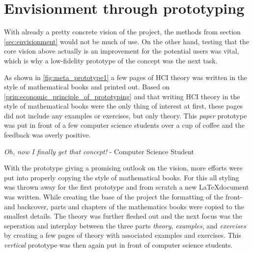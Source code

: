 \section*{Envisionment through prototyping}
With already a pretty concrete vision of the project, the methods from section \ref{sec:envisionment} would not be much of use. On the other hand, testing that the core vision above actually is an improvement for the potential users was vital, which is why a low-fidelity prototype of the concept was the next task.



As shown in \ref{fig:meta_prototype1} a few pages of HCI theory was written in the style of mathematical books and printed out. Based on \ref{prin:economic_principle_of_prototyping} and that writing HCI theory in the style of mathematical books were the only thing of interest at first, these pages did not include any examples or exercises, but only theory. This \emph{paper} prototype was put in front of a few computer science students over a cup of coffee and the feedback was overly positive.

\begin{displayquote}
  \emph{Oh, now I finally get that concept!} - Computer Science Student
\end{displayquote}

With the prototype giving a promising outlook on the vision, more efforts were put into properly copying the style of mathematical books. For this all styling was thrown away for the first prototype and from scratch a new \LaTeX document was written. While creating the base of the project the formatting of the front- and backcover, parts and chapters of the mathematics books were copied to the smallest details. The theory was further fleshed out and the next focus was the seperation and interplay between the three parts \emph{theory}, \emph{examples}, and \emph{exercises} by creating a few pages of theory with associated examples and exercises. This \emph{vertical} prototype was then again put in front of computer science students.



\todo




